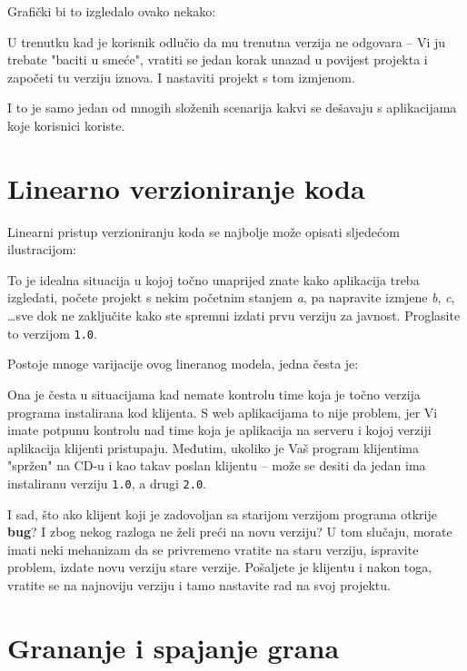 Grafički bi to izgledalo ovako nekako:



U trenutku kad je korisnik odlučio da mu trenutna verzija ne odgovara -- Vi ju trebate "baciti u smeće", vratiti se jedan korak unazad u povijest projekta i započeti tu verziju iznova. I nastaviti projekt s tom izmjenom.

I to je samo jedan od mnogih složenih scenarija kakvi se dešavaju s aplikacijama koje korisnici koriste.

\section*{Linearno verzioniranje koda}

Linearni pristup verzioniranju koda se najbolje može opisati sljedećom ilustracijom:



To je idealna situacija u kojoj točno unaprijed znate kako aplikacija treba izgledati, počete projekt s nekim početnim stanjem \emph{a}, pa napravite izmjene \emph{b}, \emph{c}, \dots sve dok ne zaključite kako ste spremni izdati prvu verziju za javnost.
Proglasite to verzijom \texttt{1.0}. 

Postoje mnoge varijacije ovog lineranog modela, jedna česta je:



Ona je česta u situacijama kad nemate kontrolu time koja je točno verzija programa instalirana kod klijenta. 
S web aplikacijama to nije problem, jer Vi imate potpunu kontrolu nad time koja je aplikacija na serveru i kojoj verziji aplikacija klijenti pristupaju.
Međutim, ukoliko je Vaš program klijentima "spržen" na CD-u i kao takav poslan klijentu -- može se desiti da jedan ima instaliranu verziju \texttt{1.0}, a drugi \texttt{2.0}.

I sad, što ako klijent koji je zadovoljan sa starijom verzijom programa otkrije \textbf{bug}?
I zbog nekog razloga ne želi preći na novu verziju?
U tom slučaju, morate imati neki mehanizam da se privremeno vratite na staru verziju, ispravite problem, izdate novu verziju stare verzije. 
Pošaljete je klijentu i nakon toga, vratite se na najnoviju verziju i tamo nastavite rad na svoj projektu.

\section*{Grananje i spajanje grana}




